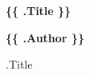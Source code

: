 \begin{titlepage}
  \begin{center}
  \thispagestyle{empty}

  \vspace*{0.5cm}

  \Huge
  \textbf{\{\{ .Title \}\}}

  \vspace{0.5cm}
  \vfill

  \Large
  \textbf{\{\{ .Author \}\}}

  \end{center}
  \clearpage

\end{titlepage}

{{ .Title }}
